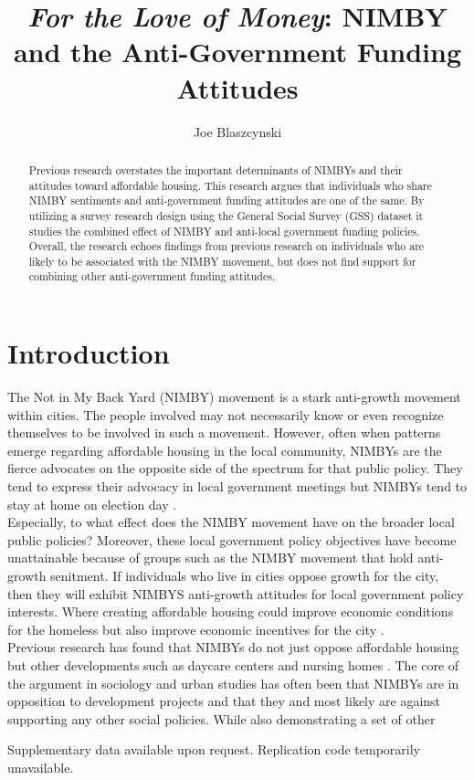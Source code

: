 \documentclass[document]{cup-journal}
\title{\emph{For the Love of Money}: NIMBY and the Anti-Government Funding Attitudes}
\author{Joe Blaszcynski}
\begin{document}
\begin{abstract}
Previous research overstates the important determinants of NIMBYs and their attitudes toward affordable housing. This research argues that individuals who share NIMBY sentiments and anti-government funding attitudes are one of the same. By utilizing a survey research design using the General Social Survey (GSS) dataset it studies the combined effect of NIMBY and anti-local government funding policies. Overall, the research echoes findings from previous research on individuals who are likely to be associated with the NIMBY movement, but does not find support for combining other anti-government funding attitudes. 
\end{abstract}

\vspace{-1.5cm}

\section*{Introduction} 

The Not in My Back Yard (NIMBY) movement is a stark anti-growth movement within cities. The people involved may not necessarily know or even recognize themselves to be involved in such a movement. However, often when patterns emerge regarding affordable housing in the local community, NIMBYs are the fierce advocates on the opposite side of the spectrum for that public policy. They tend to express their advocacy in local government meetings but NIMBYs tend to stay at home on election day \autocite{einstein2019participates}.  \\

Especially, to what effect does the NIMBY movement have on the broader local public policies? Moreover, these local government policy objectives have become unattainable because of groups such as the NIMBY movement that hold anti-growth senitment. If individuals who live in cities oppose growth for the city, then they will exhibit NIMBYS anti-growth attitudes for local government policy interests. Where creating affordable housing could improve economic conditions for the homeless but also improve economic incentives for the city \autocite{peterson1981city}. \\

Previous research has found that NIMBYs do not just oppose affordable housing but other developments such as daycare centers and nursing homes \autocite{dear1992understanding}. The core of the argument in sociology and urban studies has often been that NIMBYs are in opposition to development projects and that they and most likely are against supporting any other social policies. While also demonstrating a set of other


\printendnotes
\noindent Supplementary data available upon request. Replication code temporarily unavailable. 


\printbibliography
 
\end{document}
